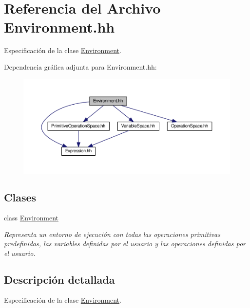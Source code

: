 \hypertarget{_environment_8hh}{}\section{Referencia del Archivo Environment.\+hh}
\label{_environment_8hh}


Especificación de la clase \hyperlink{class_environment}{Environment}.  


Dependencia gráfica adjunta para Environment.\+hh\+:
\nopagebreak
\begin{figure}[H]
\begin{center}
\leavevmode
\includegraphics[width=350pt]{_environment_8hh__incl}
\end{center}
\end{figure}
\subsection*{Clases}
\begin{DoxyCompactItemize}
\item 
class \hyperlink{class_environment}{Environment}
\begin{DoxyCompactList}\small\item\em Representa un entorno de ejecución con todas las operaciones primitivas predefinidas, las variables definidas por el usuario y las operaciones definidas por el usuario. \end{DoxyCompactList}\end{DoxyCompactItemize}


\subsection{Descripción detallada}
Especificación de la clase \hyperlink{class_environment}{Environment}. 

